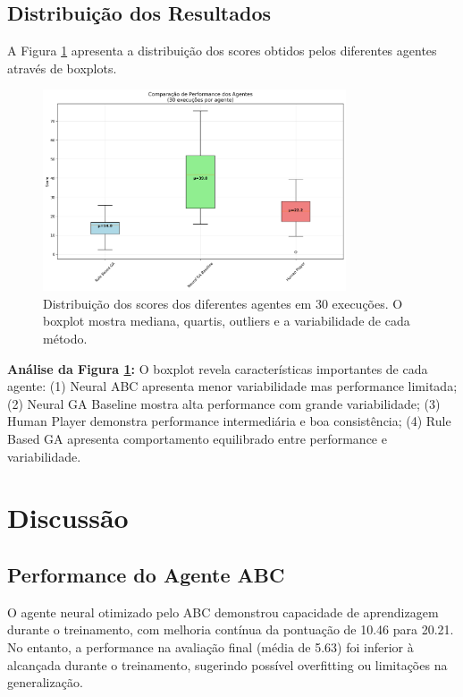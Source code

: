 \documentclass[review]{elsarticle}
\begin{document}
\subsection{Distribuição dos Resultados}

A Figura \ref{fig:boxplot} apresenta a distribuição dos scores obtidos pelos diferentes agentes através de boxplots.

\begin{figure}[htbp]
\centering
\includegraphics[width=0.8\textwidth]{boxplot_comparison.png}
\caption{Distribuição dos scores dos diferentes agentes em 30 execuções. O boxplot mostra mediana, quartis, outliers e a variabilidade de cada método.}
\label{fig:boxplot}
\end{figure}

\textbf{Análise da Figura \ref{fig:boxplot}:} O boxplot revela características importantes de cada agente: (1) Neural ABC apresenta menor variabilidade mas performance limitada; (2) Neural GA Baseline mostra alta performance com grande variabilidade; (3) Human Player demonstra performance intermediária e boa consistência; (4) Rule Based GA apresenta comportamento equilibrado entre performance e variabilidade.

\section{Discussão}

\subsection{Performance do Agente ABC}

O agente neural otimizado pelo ABC demonstrou capacidade de aprendizagem durante o treinamento, com melhoria contínua da pontuação de 10.46 para 20.21. No entanto, a performance na avaliação final (média de 5.63) foi inferior à alcançada durante o treinamento, sugerindo possível overfitting ou limitações na generalização.
\end{document}
